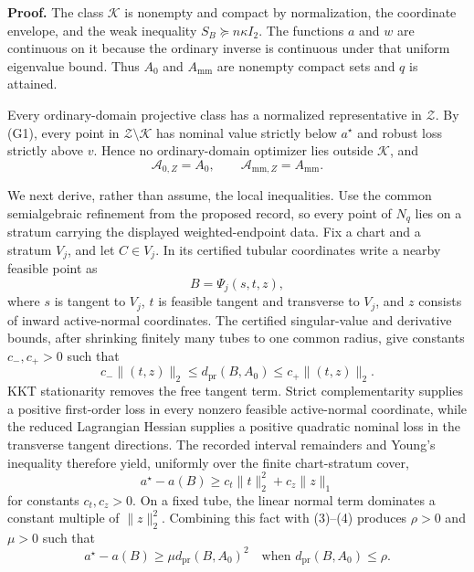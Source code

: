 \textbf{Proof.}
The class \(\mathcal K\) is nonempty and compact by normalization, the coordinate envelope, and the weak inequality \(S_B\succeq n\kappa I_2\).  The functions \(a\) and \(w\) are continuous on it because the ordinary inverse is continuous under that uniform eigenvalue bound.  Thus \(A_0\) and \(A_{\mathrm{mm}}\) are nonempty compact sets and \(q\) is attained.

Every ordinary-domain projective class has a normalized representative in \(\mathcal Z\).  By (G1), every point in \(\mathcal Z\setminus\mathcal K\) has nominal value strictly below \(a^\star\) and robust loss strictly above \(v\).  Hence no ordinary-domain optimizer lies outside \(\mathcal K\), and
\[
\mathcal A_{0,Z}=A_0,
\qquad
\mathcal A_{\mathrm{mm},Z}=A_{\mathrm{mm}}.
\tag{1}
\]

We next derive, rather than assume, the local inequalities.  Use the common semialgebraic refinement from the proposed record, so every point of \(N_q\) lies on a stratum carrying the displayed weighted-endpoint data.  Fix a chart and a stratum \(V_j\), and let \(C\in V_j\).  In its certified tubular coordinates write a nearby feasible point as
\[
B=\Psi_j(s,t,z),
\tag{2}
\]
where \(s\) is tangent to \(V_j\), \(t\) is feasible tangent and transverse to \(V_j\), and \(z\) consists of inward active-normal coordinates.  The certified singular-value and derivative bounds, after shrinking finitely many tubes to one common radius, give constants \(c_-,c_+>0\) such that
\[
c_-\lVert(t,z)\rVert_2
\le d_{\mathrm{pr}}(B,A_0)
\le c_+\lVert(t,z)\rVert_2.
\tag{3}
\]
KKT stationarity removes the free tangent term.  Strict complementarity supplies a positive first-order loss in every nonzero feasible active-normal coordinate, while the reduced Lagrangian Hessian supplies a positive quadratic nominal loss in the transverse tangent directions.  The recorded interval remainders and Young's inequality therefore yield, uniformly over the finite chart-stratum cover,
\[
a^\star-a(B)
\ge c_t\lVert t\rVert_2^2+c_z\lVert z\rVert_1
\tag{4}
\]
for constants \(c_t,c_z>0\).  On a fixed tube, the linear normal term dominates a constant multiple of \(\lVert z\rVert_2^2\).  Combining this fact with (3)--(4) produces \(\rho>0\) and \(\mu>0\) such that
\[
a^\star-a(B)\ge\mu d_{\mathrm{pr}}(B,A_0)^2
\quad\text{when }d_{\mathrm{pr}}(B,A_0)\le\rho.
\tag{5}
\]

